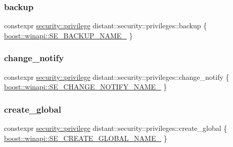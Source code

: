 \subsubsection{\texorpdfstring{backup}{backup}}
{\footnotesize\ttfamily constexpr \mbox{\hyperlink{classdistant_1_1security_1_1privilege}{security\+::privilege}} distant\+::security\+::privileges\+::backup \{ \mbox{\hyperlink{namespaceboost_1_1winapi_aeef12453f5b08b1b0796a2d201e25db6}{boost\+::winapi\+::\+S\+E\+\_\+\+B\+A\+C\+K\+U\+P\+\_\+\+N\+A\+M\+E\+\_\+}} \}}

\mbox{\label{namespacedistant_1_1security_1_1privileges_a566ea1c28a59ceb8105582cae07418b8}} 
\subsubsection{\texorpdfstring{change\+\_\+notify}{change\_notify}}
{\footnotesize\ttfamily constexpr \mbox{\hyperlink{classdistant_1_1security_1_1privilege}{security\+::privilege}} distant\+::security\+::privileges\+::change\+\_\+notify \{ \mbox{\hyperlink{namespaceboost_1_1winapi_a2e0875620298ae82bd13a78ccfde168f}{boost\+::winapi\+::\+S\+E\+\_\+\+C\+H\+A\+N\+G\+E\+\_\+\+N\+O\+T\+I\+F\+Y\+\_\+\+N\+A\+M\+E\+\_\+}} \}}

\mbox{\label{namespacedistant_1_1security_1_1privileges_a2a87cff7c67e6c1e29b4ecd3380210d7}} 
\subsubsection{\texorpdfstring{create\+\_\+global}{create\_global}}
{\footnotesize\ttfamily constexpr \mbox{\hyperlink{classdistant_1_1security_1_1privilege}{security\+::privilege}} distant\+::security\+::privileges\+::create\+\_\+global \{ \mbox{\hyperlink{namespaceboost_1_1winapi_a66aeb4ef7086d623c9891dfcbb82bbd9}{boost\+::winapi\+::\+S\+E\+\_\+\+C\+R\+E\+A\+T\+E\+\_\+\+G\+L\+O\+B\+A\+L\+\_\+\+N\+A\+M\+E\+\_\+}} \}}

